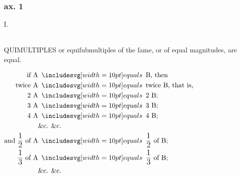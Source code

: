 \begin{center}
    \begin{minipage}{0.80\textwidth}
        \subsubsection{ax. 1}
        \begin{center}
            I.\label{book5ax1}\\
            \hfill\\
            \raggedright \lettrine[lines=3, loversize=1, nindent=0pt]{}{}QUIMULTIPLES or equiſubmultiples of the ſame, or of equal magnitudes, are equal.
        \end{center}

        \hfill

        \centering

        $\begin{aligned}
                \text{if A}                                                       & \bequals \text{B, then}                                         \\
                \text{twice A}                                                    & \bequals \text{twice B, that is,}                               \\
                \text{2 A}                                                        & \bequals \text{2 B;}                                            \\
                \text{3 A}                                                        & \bequals \text{3 B;}                                            \\
                \text{4 A}                                                        & \bequals \text{4 B;}                                            \\
                                                                                  & \text{\&c. \&c.}                                                \\
                \text{and } \dfrac{\text{\large 1}}{\text{\large 2}} \text{ of A} & \bequals \dfrac{\text{\large 1}}{\text{\large 2}} \text{ of B;} \\
                \dfrac{\text{\large 1}}{\text{\large 3}} \text{ of A}             & \bequals \dfrac{\text{\large 1}}{\text{\large 3}} \text{ of B;} \\
                                                                                  & \text{\&c. \&c.}
            \end{aligned}$\\


\end{minipage}
\end{center}
